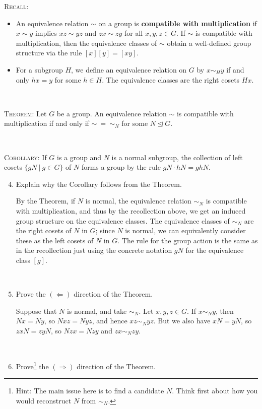 \documentclass[12pt]{amsart}
\newcommand{\Bold}[1]{\contour{black}{#1}}
\newcommand{\solution}[1]{\ifthenelse {\equal{\displaysol}{1}} {\begin{framed}{\color{meretale}\noindent #1}\end{framed}} { \ }}
\newcommand\itemA{\stepcounter{enumi}\item[{\Bold{(\theenumi)}}]}
\newcommand\itemB{\stepcounter{enumi}\item[(\theenumi)]}
\begin{document}
\smallskip


\begin{framed}
\textsc{Recall:}
\begin{itemize}
\item An equivalence relation $\sim$ on a group is \textbf{compatible with multiplication} if $x \sim y$ implies ${xz \sim yz}$ and ${zx \sim zy}$ for all $x,y,z\in G$. If $\sim$ is compatible with multiplication, then the equivalence classes of $\sim$ obtain a well-defined group structure via the rule $[x][y] = [xy]$.
\item For a subgroup $H$, we define an equivalence relation on $G$ by $x\sim_H y$ if and only $hx = y$ for some $h\in H$. The equivalence classes are the right cosets $Hx$.
\end{itemize}

\


\textsc{Theorem:} Let $G$ be a group. An equivalence relation $\sim$ is compatible with multiplication if and only if ${\sim \ =\ \sim_N}$ for some $N\trianglelefteq G$.

\

\textsc{Corollary:} If $G$ is a group and $N$ is a normal subgroup, the collection of left cosets $\{gN \ | \ g\in G\}$ of $N$ forms a group by the rule $gN \cdot hN = ghN$.
\end{framed}

\smallskip

\begin{enumerate}\setcounter{enumi}{3}
\itemA Explain why the Corollary follows from the Theorem.

\solution{By the Theorem, if $N$ is normal, the equivalence relation $\sim_N$ is compatible with multiplication, and thus by the recollection above, we get an induced group structure on the equivalence classes. The equivalence classes of $\sim_N$ are the right cosets of $N$ in $G$; since $N$ is normal, we can equivalently consider these as the left cosets of $N$ in $G$. The rule for the group action is the same as in the recollection just using the concrete notation $gN$ for the equivalence class $[g]$.}


\itemA Prove the $(\Leftarrow)$ direction of the Theorem.

\solution{Suppose that $N$ is normal, and take $\sim_N$. Let $x,y,z\in G$. If $x\sim_N y$, then $Nx = Ny$, so $Nxz = Nyz$, and hence $xz \sim_N yz$. But we also have $xN=yN$, so $zxN=zyN$, so $Nzx=Nzy$ and $zx\sim_N zy$.}

\itemB Prove\footnote{Hint: The main issue here is to find a candidate $N$. Think first about how you would reconstruct $N$ from $\sim_N$.} the $(\Rightarrow)$ direction of the Theorem.
\end{enumerate}
\end{document}
